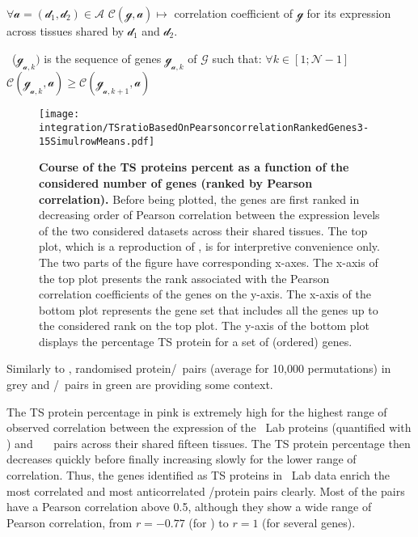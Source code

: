 \begin{eqlist}[\setlength{\itemsep}{0em}%
         \setlength{\topsep}{0em}%
         \setlength{\partopsep}{0em}%
         \setlength{\parskip}{0em}%
         \setlength{\parsep}{0em}]
             $\forall \mathcal{a} = (\mathcal{d}_1,\mathcal{d}_2)
             \in \mathcal{A}$
             $\mathcal{C}(\mathcal{g},\mathcal{a}) \longmapsto$ correlation
             coefficient of $\mathcal{g}$ for its expression across tissues
             shared by $\mathcal{d}_1$ and $\mathcal{d}_2$.
         \item[\textbullet\ ($\mathcal{g}_{\mathcal{a},k})$] is the sequence of
                 genes $\mathcal{g}_{\mathcal{a},k}$ of $\mathcal{G}$ such that:
                 $\forall k \in [1; \mathcal{N}-1]$
                 $\mathcal{C}(\mathcal{g}_{\mathcal{a},k},\mathcal{a}) ≥
                 \mathcal{C}(\mathcal{g}_{\mathcal{a},k+1},\mathcal{a})$
 \end{eqlist}

\begin{figure}[!ht]
    \texttt{[image: integration/TSratioBasedOnPearsoncorrelationRankedGenes3-15SimulrowMeans.pdf]}\centering
    \vspace{-3mm}
    \caption[Course of the TS proteins percentage as a function of
    the considered number of genes (ranked by Pearson correlation)]{\label{fig:Spe_Cor}%
    \textbf{Course of the TS proteins percent as a function of the considered
    number of genes (ranked by Pearson correlation).}
    Before being plotted,
    the genes are first ranked in decreasing order of Pearson correlation
    between the expression levels of the two considered datasets
    across their shared tissues.
    The top plot, which is a reproduction of ,
    is for interpretive convenience only.
    The two parts of the figure have corresponding x-axes.
    The x-axis of the top plot presents the rank associated with
    the Pearson correlation coefficients of the genes on the y-axis.
    The x-axis of the bottom plot represents the gene set that includes
    all the genes up to the considered rank on the top plot.
    The y-axis of the bottom plot displays the percentage \gls{TS} protein
    for a set of (ordered) genes.
    }
\end{figure}

Similarly to ,
randomised protein/\mRNA\ pairs (average for 10,000 permutations) in grey
and \mRNA/\mRNA\ pairs in green are providing some context.

The \gls{TS} protein percentage in pink is extremely high
for the highest range of observed correlation between the expression of
the \pandey\ Lab proteins (quantified with \PPKM) and
\uhlen\ \etal\ \mRNAs\ pairs
across their shared fifteen tissues.
The \gls{TS} protein percentage then decreases quickly
before finally increasing slowly for the lower range of correlation.
Thus, the genes identified as \gls{TS} proteins in \pandey\ Lab data enrich
the most correlated and most anticorrelated \mRNA/protein pairs clearly.
Most of the pairs have a Pearson correlation above 0.5,
although they show a wide range of Pearson correlation,
from $r= -0.77$ (for ) to $r=1$ (for several genes).

